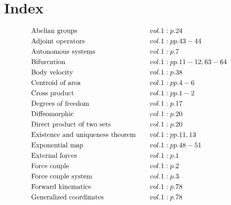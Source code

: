 \documentclass[a4paper]{article}
\begin{document}
 
\section*{Index} 
\allowdisplaybreaks 
\begin{align*} 
&\text{Abelian groups} \hspace*{1em}&& vol. 1: p. 24\\
&\text{Adjoint operators} \hspace*{1em}&& vol. 1: pp. 43-44\\
&\text{Autonomous systems} \hspace*{1em}&& vol. 1: p. 7\\
&\text{Bifurcation} \hspace*{1em}&& vol. 1: pp. 11-12, 63-64\\
&\text{Body velocity} \hspace*{1em}&& vol. 1: p. 38\\
&\text{Centroid of area} \hspace*{1em}&& vol. 1: pp. 4-6\\
&\text{Cross product} \hspace*{1em}&& vol. 1: pp. 1-2\\
&\text{Degrees of freedom} \hspace*{1em}&& vol. 1: p. 17\\
&\text{Diffeomorphic} \hspace*{1em}&& vol. 1: p. 20\\
&\text{Direct product of two sets} \hspace*{1em}&& vol. 1: p. 20\\
&\text{Existence and uniqueness theorem} \hspace*{1em}&& vol. 1: pp. 11, 13\\
&\text{Exponential map} \hspace*{1em}&& vol. 1: pp. 48-51\\
&\text{External forces} \hspace*{1em}&& vol. 1: p. 1\\
&\text{Force couple} \hspace*{1em}&& vol. 1: p. 2\\
&\text{Force couple system} \hspace*{1em}&& vol. 1: p. 3\\
&\text{Forward kinematics} \hspace*{1em}&& vol. 1: p. 78\\
&\text{Generalized coordinates} \hspace*{1em}&& vol. 1: p. 78\\

\end{align*}
\end{document}

